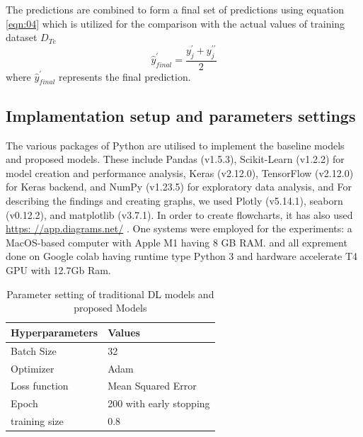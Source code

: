 \documentclass[sn-mathphys,Numbered]{sn-jnl}
\theoremstyle{thmstyleone}
\theoremstyle{thmstyletwo}
\theoremstyle{thmstylethree}
\begin{document}
The predictions are combined to form a final set of predictions using equation \ref{eqn:04} which is utilized for the comparison with the actual values of training dataset $D_{Te}$
\begin{equation}
\label{eqn:04}
\hat{y}_{final}^{\prime}=\frac{y_j^{\prime}+y_j^{\prime\prime}}{2}
\end{equation}
where $\hat{y}_{final}^{\prime}$ represents the final prediction.
\subsection{Implamentation setup and parameters settings}
The various packages of Python are utilised to implement the baseline models and  proposed models. These include Pandas (v1.5.3), Scikit-Learn (v1.2.2) for model creation and performance analysis, Keras (v2.12.0), TensorFlow (v2.12.0) for Keras backend, and NumPy (v1.23.5) for exploratory data analysis,  and For describing the findings and creating graphs, we used Plotly (v5.14.1), seaborn (v0.12.2), and matplotlib (v3.7.1). In order to create flowcharts, it has also used \href{https: //app.diagrams.net/}{https: //app.diagrams.net/} . One systems were employed for the experiments:  a MacOS-based computer with Apple M1 having 8 GB RAM. and all exprement done on Google colab having runtime type Python 3 and hardware accelerate T4 GPU with 12.7Gb Ram.

\begin{table}[h!]
  \caption{Parameter setting of traditional DL models and proposed Models}
  \label{tab: my-table}
  \begin{tabular}{ll}
  \hline Hyperparameters & Values        \\ \hline
  Batch Size               & 32                     \\
  Optimizer                 & Adam                   \\
  Loss function            & Mean Squared Error      \\
  Epoch                    & 200 with early stopping \\
  training size             & 0.8                   \\ \hline
  \end{tabular}
  \end{table}
\end{document}

